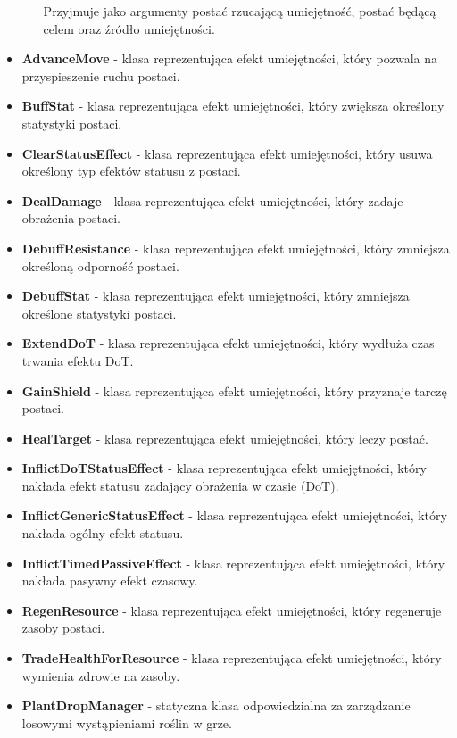 \begin{itemize}
\begin{itemize}
                Przyjmuje jako argumenty postać rzucającą umiejętność, postać będącą celem oraz źródło umiejętności.
            \end{itemize}
        \item \textbf{AdvanceMove} - klasa reprezentująca efekt umiejętności, który pozwala na przyspieszenie ruchu postaci. 
        \item \textbf{BuffStat} - klasa reprezentująca efekt umiejętności, który zwiększa określony statystyki postaci. 
        \item \textbf{ClearStatusEffect} - klasa reprezentująca efekt umiejętności, który usuwa określony typ efektów statusu z postaci. 
        \item \textbf{DealDamage} - klasa reprezentująca efekt umiejętności, który zadaje obrażenia postaci. 
        \item \textbf{DebuffResistance} - klasa reprezentująca efekt umiejętności, który zmniejsza określoną odporność postaci. 
        \item \textbf{DebuffStat} - klasa reprezentująca efekt umiejętności, który zmniejsza określone statystyki postaci. 
        \item \textbf{ExtendDoT} - klasa reprezentująca efekt umiejętności, który wydłuża czas trwania efektu DoT.
        \item \textbf{GainShield} - klasa reprezentująca efekt umiejętności, który przyznaje tarczę postaci. 
        \item \textbf{HealTarget} - klasa reprezentująca efekt umiejętności, który leczy postać. 
        \item \textbf{InflictDoTStatusEffect} - klasa reprezentująca efekt umiejętności, który nakłada efekt statusu zadający obrażenia w czasie (DoT). 
        \item \textbf{InflictGenericStatusEffect} - klasa reprezentująca efekt umiejętności, który nakłada ogólny efekt statusu. 
        \item \textbf{InflictTimedPassiveEffect} - klasa reprezentująca efekt umiejętności, który nakłada pasywny efekt czasowy. 
        \item \textbf{RegenResource} - klasa reprezentująca efekt umiejętności, który regeneruje zasoby postaci. 
        \item \textbf{TradeHealthForResource} - klasa reprezentująca efekt umiejętności, który wymienia zdrowie na zasoby.
        \item \textbf{PlantDropManager} - statyczna klasa odpowiedzialna za zarządzanie losowymi wystąpieniami roślin w grze. 

\end{itemize}
